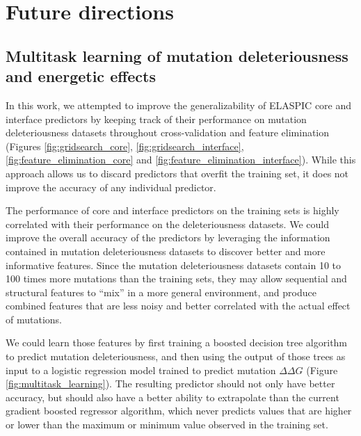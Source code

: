 
\chapter{Future directions} \label{ch:future_directions}


\section{Multitask learning of mutation deleteriousness and energetic effects} \label{sec:multitask_learning}


In this work, we attempted to improve the generalizability of ELASPIC core and interface predictors by keeping track of their performance on mutation deleteriousness datasets throughout cross-validation and feature elimination (Figures \ref{fig:gridsearch_core}, \ref{fig:gridsearch_interface}, \ref{fig:feature_elimination_core} and \ref{fig:feature_elimination_interface}). While this approach allows us to discard predictors that overfit the training set, it does not improve the accuracy of any individual predictor.

The performance of core and interface predictors on the training sets is highly correlated with their performance on the deleteriousness datasets. We could improve the overall accuracy of the predictors by leveraging the information contained in mutation deleteriousness datasets to discover better and more informative features. Since the mutation deleteriousness datasets contain 10 to 100 times more mutations than the training sets, they may allow sequential and structural features to ``mix'' in a more general environment, and produce combined features that are less noisy and better correlated with the actual effect of mutations.

We could learn those features by first training a boosted decision tree algorithm to predict mutation deleteriousness, and then using the output of those trees as input to a logistic regression model trained to predict mutation $\Delta \Delta G$ (Figure \ref{fig:multitask_learning}). The resulting predictor should not only have better accuracy, but should also have a better ability to extrapolate than the current gradient boosted regressor algorithm, which never predicts values that are higher or lower than the maximum or minimum value observed in the training set.

